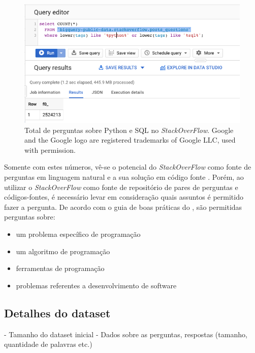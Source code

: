 \begin{figure}[h]
\includegraphics[width=12cm]{src/figuras/cap-problema/post-questions-python-sql-total.png}
\caption{Total de perguntas sobre Python e SQL no \textit{StackOverFlow}. Google and the Google logo are registered trademarks of Google LLC, used with permission.}
\label{fig:bigquery-total-questions-python-sql-stackoverflow}
\end{figure}

Somente com estes números, vê-se o potencial do \textit{StackOverFlow} como fonte de perguntas em linguagem natural e a sua solução em código fonte \cite{yao-2018}. Porém, ao utilizar o \textit{StackOverFlow} como fonte de repositório de pares de perguntas e códigos-fontes, é necessário levar em consideração quais assuntos é permitido fazer a pergunta. De acordo com o guia de boas práticas do \cite{stackoverflow-questions-topics-2019}, são permitidas perguntas sobre:

\begin{itemize}
    \item um problema específico de programação
    \item um algoritmo de programação
    \item ferramentas de programação
    \item problemas referentes a desenvolvimento de software
\end{itemize}



\subsection{Detalhes do dataset}

 - Tamanho do dataset inicial
 - Dados sobre as perguntas, respostas (tamanho, quantidade de palavras etc.)

